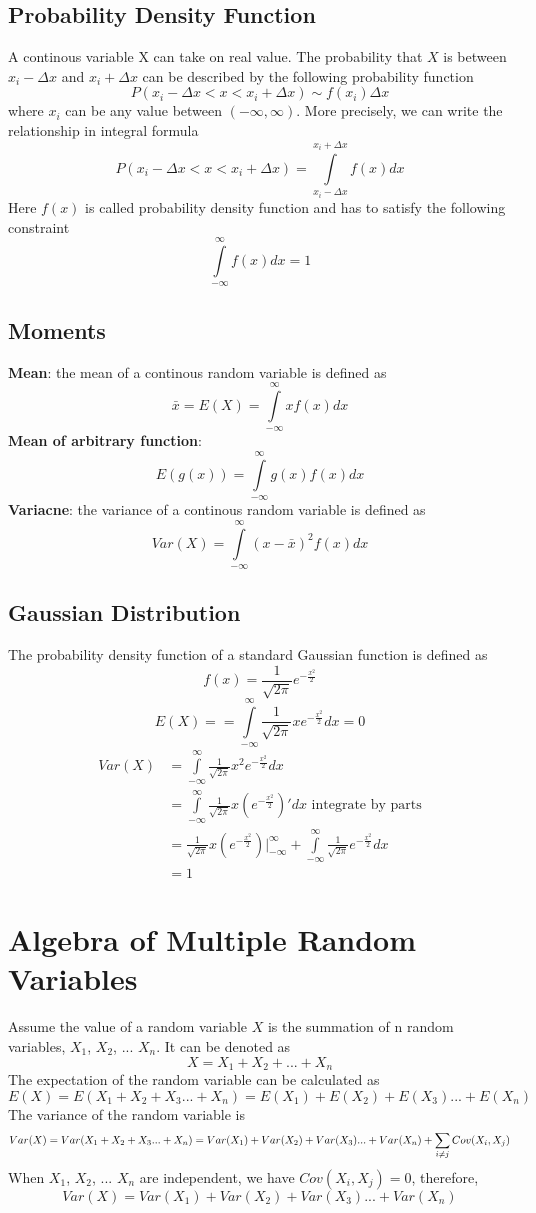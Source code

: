 \documentclass[12pt, oneside]{article}
\begin{document}
\subsection{Probability Density Function}
A continous variable X can take on real value. The probability that $X$ is between $x_i-\Delta x$ and $x_i+ \Delta x$ can be described by the following probability function
$$P(x_i-\Delta x<x<x_i+\Delta x)\sim f(x_i)\Delta x$$
where $x_i$ can be any value between $(-\infty, \infty)$. More precisely, we can write the relationship in integral formula
$$P(x_i-\Delta x<x<x_i+\Delta x)=\int\limits_{x_i-\Delta x}^{x_i+\Delta x}f(x)dx$$
Here $f(x)$ is called probability density function and has to satisfy the following constraint
$$\int\limits_{-\infty}^{\infty}f(x)dx=1$$
\subsection{Moments}
\textbf{Mean}: the mean of a continous random variable is defined as 
$$\bar{x}=E(X)=\int\limits_{-\infty}^{\infty}xf(x)dx$$
\textbf{Mean of arbitrary function}:
$$E(g(x))=\int\limits_{-\infty}^{\infty}g(x)f(x)dx$$
\textbf{Variacne}: the variance of a continous random variable is defined as 
$$Var(X)=\int\limits_{-\infty}^{\infty}(x-\bar{x})^2f(x)dx$$

\subsection{Gaussian Distribution}
The probability density function of a standard Gaussian function is defined as 
$$f(x)=\frac{1}{\sqrt{2\pi}}e^{-\frac{x^2}{2}}$$
$$E(X)==\int\limits_{-\infty}^{\infty}\frac{1}{\sqrt{2\pi}}xe^{-\frac{x^2}{2}}dx=0$$
\begin{align*}
Var(X)&=\int\limits_{-\infty}^{\infty}\frac{1}{\sqrt{2\pi}}x^2e^{-\frac{x^2}{2}}dx\\
&=\int\limits_{-\infty}^{\infty}\frac{1}{\sqrt{2\pi}}x(e^{-\frac{x^2}{2}})'dx \text{ integrate by parts}\\
&=\frac{1}{\sqrt{2\pi}}x(e^{-\frac{x^2}{2}})|_{-\infty}^{\infty}+\int\limits_{-\infty}^{\infty}\frac{1}{\sqrt{2\pi}}e^{-\frac{x^2}{2}}dx\\
&=1
\end{align*}

\section{Algebra of Multiple Random Variables}
Assume the value of a random variable $X$ is the summation of n random variables, $X_1$, $X_2$, ... $X_n$. It can be denoted as
$$X=X_1+X_2+ ... +X_n$$
The expectation of the random variable can be calculated as 
$$E(X)=E(X_1+X_2+X_3 ... +X_n)=E(X_1)+E(X_2)+E(X_3)...+E(X_n)$$
The variance of the random variable is 
$$Var(X)=Var(X_1+X_2+X_3 ... +X_n)=Var(X_1)+Var(X_2)+Var(X_3)...+Var(X_n)+\sum_{i\neq	j}\mathnormal{Cov}(X_i, X_j)$$
When $X_1$, $X_2$, ... $X_n$ are independent, we have $Cov(X_i, X_j)=0$, therefore,
$$Var(X)=Var(X_1)+Var(X_2)+Var(X_3)...+Var(X_n)$$
\end{document}
